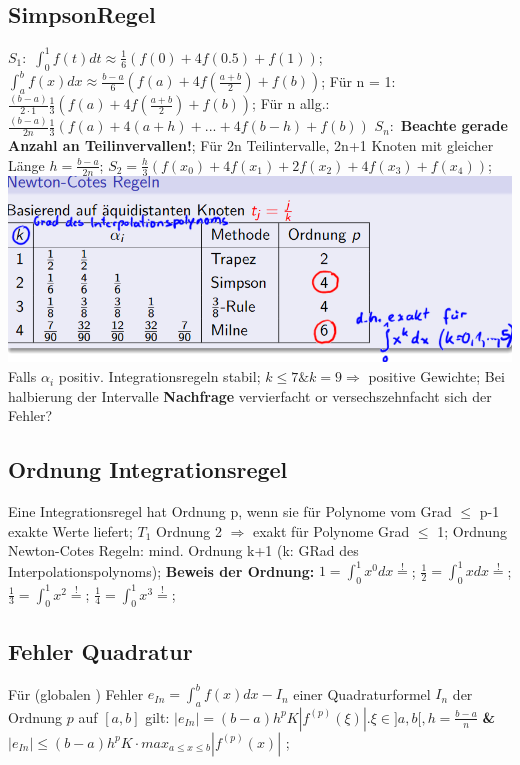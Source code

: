 \subsection{SimpsonRegel}
$ S_{1}: $ 
$ \int_{0}^{1} f (t) dt \approx \frac{1}{6} ( f(0) + 4f(0.5) + f(1) ) $; 
$\int_{a}^{b} f (x) dx \approx \frac{b-a}{6} ( f(a) + 4f( \frac{a+b}{2}) + f(b) ) $; 
Für n = 1: $\frac{( b-a )}{2\cdot1} \frac{1}{3} ( f(a) + 4f( \frac{a+b}{2}) + f(b) ) $; 
Für n allg.: $ \frac{( b-a) }{2n}\frac{1}{3} ( f(a) + 4(a+h) + ... + 4f(b-h)+ f(b) ) $ 
$ S_{n}:$ 
\textbf{Beachte gerade Anzahl an Teilinvervallen!}; 
Für 2n Teilintervalle, 2n+1 Knoten mit gleicher Länge $ h = \frac{ b-a }{2n} $; 
$ S_{2} = \frac{h}{3} ( f(x_{0}) + 4f(x_{1}) + 2f(x_{2}) + 4f(x_{3}) + f(x_{4}) ) $; 
\includegraphics[scale=0.25]{./pic/NewtonCodesRegeln.png}
Falls $\alpha_{i} $ positiv. Integrationsregeln stabil; 
$ k \le 7 \& k =9 \Rightarrow $ positive Gewichte;
Bei halbierung der Intervalle \textbf{Nachfrage} vervierfacht or versechszehnfacht sich der Fehler?
\subsection{Ordnung Integrationsregel}
Eine Integrationsregel hat Ordnung p, wenn sie für Polynome vom Grad $\le$ p-1 exakte Werte liefert; $ T_{1} $ Ordnung 2 $\Rightarrow$ exakt für Polynome Grad $\le$ 1; 
Ordnung Newton-Cotes Regeln: mind. Ordnung k+1 (k: GRad des Interpolationspolynoms);
\textbf{Beweis der Ordnung:}
$ 1 = \int_{0}^{1} x^{0} dx \overset{!}{=} $; 
$ \frac{1}{2} = \int_{0}^{1} x dx \overset{!}{=} $; 
$ \frac{1}{3} = \int_{0}^{1} x^{2} \overset{!}{=} $; 
$ \frac{1}{4} = \int_{0}^{1} x^{3} \overset{!}{=} $; 
\subsection{Fehler Quadratur}
Für (globalen ) Fehler $ e_{In}  = \int_{a}^{b} f(x) dx -I_{n} $ einer Quadraturformel $I_{n} $ der Ordnung $ p$  auf $ [a,b] $ gilt: 
$ |e_{In} | = (b-a) h^{p}K|f^{ (p) } (\xi)| . \xi \in ]a,b[, h = \frac{ b-a }{ n}  $ \textbf{\&} 
$ |e_{In} | \le (b-a) h^{p} K \cdot max_{a \le x \le b} | f^{ (p) } (x) | $ ; 
